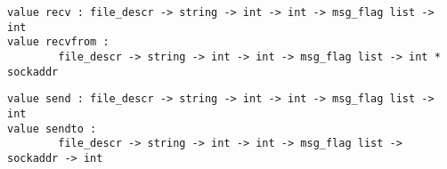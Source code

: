 %
\begin{comment}
 Shutdown a socket connection. \verbSHUTDOWN_SEND as second argument
           causes reads on the other end of the connection to return
           an end-of-file condition.
           \verbSHUTDOWN_RECEIVE causes writes on the other end of the connection
           to return a closed pipe condition (\verbSIGPIPE signal). 
\end{comment}
\begin{verbatim}
value recv : file_descr -> string -> int -> int -> msg_flag list -> int
value recvfrom :
        file_descr -> string -> int -> int -> msg_flag list -> int * sockaddr
\end{verbatim}
%
%
\begin{comment}
 Receive data from an unconnected socket. 
\end{comment}
\begin{verbatim}
value send : file_descr -> string -> int -> int -> msg_flag list -> int
value sendto :
        file_descr -> string -> int -> int -> msg_flag list -> sockaddr -> int
\end{verbatim}
%
%
\begin{comment}
 Send data over an unconnected socket. 
\end{comment}

